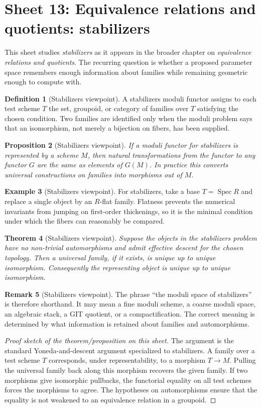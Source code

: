 \documentclass[11pt]{amsart}
\newtheorem{theorem}{Theorem}[section]
\newtheorem{proposition}[theorem]{Proposition}
\theoremstyle{definition}
\newtheorem{definition}[theorem]{Definition}
\newtheorem{example}[theorem]{Example}
\newtheorem{remark}[theorem]{Remark}
\newcommand{\Spec}{\operatorname{Spec}}
\begin{document}
\section{Sheet 13: Equivalence relations and quotients: stabilizers}
This sheet studies \emph{stabilizers} as it appears in the broader chapter on \emph{equivalence relations and quotients}.  The recurring question is whether a proposed parameter space remembers enough information about families while remaining geometric enough to compute with.
\begin{definition}[Stabilizers viewpoint]
A stabilizers moduli functor assigns to each test scheme $T$ the set, groupoid, or category of families over $T$ satisfying the chosen condition.  Two families are identified only when the moduli problem says that an isomorphism, not merely a bijection on fibers, has been supplied.
\end{definition}
\begin{proposition}[Stabilizers viewpoint]
If a moduli functor for stabilizers is represented by a scheme $M$, then natural transformations from the functor to any functor $G$ are the same as elements of $G(M)$.  In practice this converts universal constructions on families into morphisms out of $M$.
\end{proposition}
\begin{example}[Stabilizers viewpoint]
For stabilizers, take a base $T=\Spec R$ and replace a single object by an $R$-flat family.  Flatness prevents the numerical invariants from jumping on first-order thickenings, so it is the minimal condition under which the fibers can reasonably be compared.
\end{example}
\begin{theorem}[Stabilizers viewpoint]
Suppose the objects in the stabilizers problem have no non-trivial automorphisms and admit effective descent for the chosen topology.  Then a universal family, if it exists, is unique up to unique isomorphism.  Consequently the representing object is unique up to unique isomorphism.
\end{theorem}
\begin{remark}[Stabilizers viewpoint]
The phrase ``the moduli space of stabilizers'' is therefore shorthand.  It may mean a fine moduli scheme, a coarse moduli space, an algebraic stack, a GIT quotient, or a compactification.  The correct meaning is determined by what information is retained about families and automorphisms.
\end{remark}
\begin{proof}[Proof sketch of the theorem/proposition on this sheet]
The argument is the standard Yoneda-and-descent argument specialized to stabilizers.  A family over a test scheme $T$ corresponds, under representability, to a morphism $T\to M$.  Pulling the universal family back along this morphism recovers the given family.  If two morphisms give isomorphic pullbacks, the functorial equality on all test schemes forces the morphisms to agree.  The hypotheses on automorphisms ensure that the equality is not weakened to an equivalence relation in a groupoid.
\end{proof}
\end{document}
